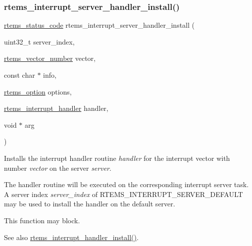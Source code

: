 \subsubsection{\texorpdfstring{rtems\_interrupt\_server\_handler\_install()}{rtems\_interrupt\_server\_handler\_install()}}
{\footnotesize\ttfamily \mbox{\hyperlink{group__ClassicStatus_ga545d41846817eaba6143d52ee4d9e9fe}{rtems\+\_\+status\+\_\+code}} rtems\+\_\+interrupt\+\_\+server\+\_\+handler\+\_\+install (\begin{DoxyParamCaption}\item[{uint32\+\_\+t}]{server\+\_\+index,  }\item[{\mbox{\hyperlink{group__ClassicINTR_ga3e434c197d99f128e78cae4d9358bd8b}{rtems\+\_\+vector\+\_\+number}}}]{vector,  }\item[{const char $\ast$}]{info,  }\item[{\mbox{\hyperlink{group__ClassicOptions_gad26685eb0e60a9650082935c31920e29}{rtems\+\_\+option}}}]{options,  }\item[{\mbox{\hyperlink{group__rtems__interrupt__extension_gab39bd096ab2c3b41d03dace0e9777b08}{rtems\+\_\+interrupt\+\_\+handler}}}]{handler,  }\item[{void $\ast$}]{arg }\end{DoxyParamCaption})}



Installs the interrupt handler routine {\itshape handler} for the interrupt vector with number {\itshape vector} on the server {\itshape server}. 

The handler routine will be executed on the corresponding interrupt server task. A server index {\itshape server\+\_\+index} of {\ttfamily R\+T\+E\+M\+S\+\_\+\+I\+N\+T\+E\+R\+R\+U\+P\+T\+\_\+\+S\+E\+R\+V\+E\+R\+\_\+\+D\+E\+F\+A\+U\+LT} may be used to install the handler on the default server.

This function may block.

\begin{DoxySeeAlso}{See also}
\mbox{\hyperlink{group__rtems__interrupt__extension_ga086cc450fcdc9e37bfd0744a763dbfd4}{rtems\+\_\+interrupt\+\_\+handler\+\_\+install()}}.
\end{DoxySeeAlso}

